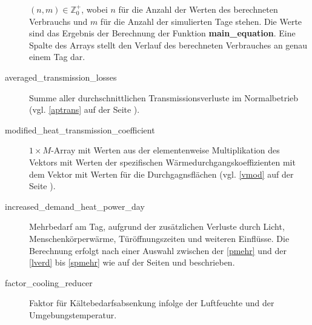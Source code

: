 \begin{description}
	$(n,m)\in \mathbb{Z}^+_0$, wobei $n$ f\"ur die Anzahl der Werten des
	berechneten Verbrauchs und $m$ f\"ur die Anzahl der simulierten Tage
	stehen. Die Werte sind das Ergebnis der
	Berechnung der Funktion \textbf{main\_equation}. Eine Spalte des Arrays
	stellt den Verlauf des berechneten Verbrauches an genau einem Tag dar.
	\item[averaged\_transmission\_losses] Summe aller durchschnittlichen
	Transmissionsverluste im Normalbetrieb (vgl. \cref{aptrans} auf der
	Seite \pageref{aptrans}).
	\item[modified\_heat\_transmission\_coefficient] $1\times M$-Array mit
	Werten aus der elementenweise Multiplikation des Vektors mit Werten der
	spezifischen W\"armedurchgangskoeffizienten mit dem Vektor mit Werten
	f\"ur die Durchgagnsfl\"achen (vgl. \cref{vmod} auf der Seite
	\pageref{vmod}).
	\item[increased\_demand\_heat\_power\_day] Mehrbedarf am Tag, aufgrund
	der zus\"atzlichen Verluste durch Licht, Menschenk\"orperw\"arme,
	T\"ur\"offnungszeiten und weiteren Einfl\"usse. Die Berechnung erfolgt
	nach einer Auswahl zwischen der \cref{pmehr} und der \cref{lverd} bis
	\cref{spmehr} wie auf der Seiten \pageref{pmehr} und \pageref{spmehr}
	beschrieben.

	\item[factor\_cooling\_reducer] Faktor f\"ur K\"altebedarfsabsenkung
	infolge der Luftfeuchte und der Umgebungstemperatur.
\end{description}

